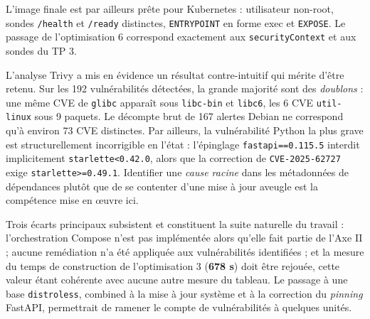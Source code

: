 \documentclass[11pt,a4paper]{report}
\newcommand{\num}[1]{\textbf{#1}}
\begin{document}
L'image finale est par ailleurs prête pour Kubernetes : utilisateur non-root,
sondes \texttt{/health} et \texttt{/ready} distinctes, \texttt{ENTRYPOINT} en
forme exec et \texttt{EXPOSE}. Le passage de l'optimisation 6 correspond
exactement aux \texttt{securityContext} et aux sondes du TP 3.

L'analyse Trivy a mis en évidence un résultat contre-intuitif qui mérite
d'être retenu. Sur les 192 vulnérabilités détectées, la grande majorité sont
des \emph{doublons} : une même CVE de \texttt{glibc} apparaît sous
\texttt{libc-bin} et \texttt{libc6}, les 6 CVE \texttt{util-linux} sous
9 paquets. Le décompte brut de 167 alertes Debian ne correspond qu'à environ
73 CVE distinctes. Par ailleurs, la vulnérabilité Python la plus grave est
structurellement incorrigible en l'état : l'épinglage
\texttt{fastapi==0.115.5} interdit implicitement
\texttt{starlette<0.42.0}, alors que la correction de
\texttt{CVE-2025-62727} exige \texttt{starlette>=0.49.1}. Identifier une
\emph{cause racine} dans les métadonnées de dépendances plutôt que de se
contenter d'une mise à jour aveugle est la compétence mise en œuvre ici.

Trois écarts principaux subsistent et constituent la suite naturelle du
travail : l'orchestration Compose n'est pas implémentée alors qu'elle fait
partie de l'Axe II ; aucune remédiation n'a été appliquée aux vulnérabilités
identifiées ; et la mesure du temps de construction de l'optimisation 3
(\num{678 s}) doit être rejouée, cette valeur étant cohérente avec aucune autre
mesure du tableau. Le passage à une base \texttt{distroless}, combined à la mise
à jour système et à la correction du \emph{pinning} FastAPI, permettrait de
ramener le compte de vulnérabilités à quelques unités.
\end{document}
